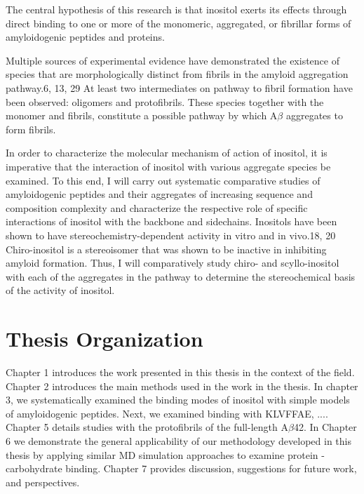 The central hypothesis of this research is that inositol exerts its effects through direct binding to one or more of the monomeric, aggregated, or fibrillar forms of amyloidogenic peptides and proteins.   

Multiple sources of experimental evidence have demonstrated the existence of species that are morphologically distinct from fibrils in the amyloid aggregation pathway.6, 13, 29 At least two intermediates on pathway to fibril formation have been observed: oligomers and protofibrils. These species together with the monomer and fibrils, constitute a possible pathway by which A$\beta$ aggregates to form fibrils. 

In order to characterize the molecular mechanism of action of inositol, it is imperative that the interaction of inositol with various aggregate species be examined. To this end, I will carry out systematic comparative studies of amyloidogenic peptides and their aggregates of increasing sequence and composition complexity and characterize the respective role of specific interactions of inositol with the backbone and sidechains. Inositols have been shown to have stereochemistry-dependent activity in vitro and in vivo.18, 20 Chiro-inositol is a stereoisomer that was shown to be inactive in inhibiting amyloid formation. Thus, I will comparatively study chiro- and scyllo-inositol with each of the aggregates in the pathway to determine the stereochemical basis of the activity of inositol.

\section{Thesis Organization}
Chapter 1 introduces the work presented in this thesis in the context of the field. Chapter 2 introduces the main methods used in the work in the thesis.   In chapter 3, we systematically examined the binding modes of inositol with simple models of amyloidogenic peptides. Next, we examined binding with KLVFFAE, .... Chapter 5 details studies with the protofibrils of the full-length A$\beta$42. In Chapter 6 we demonstrate the general applicability of our methodology developed in this thesis by applying similar MD simulation approaches to examine protein - carbohydrate binding. Chapter 7 provides discussion, suggestions for future work, and perspectives.

\begin{singlespace}


\end{singlespace}

